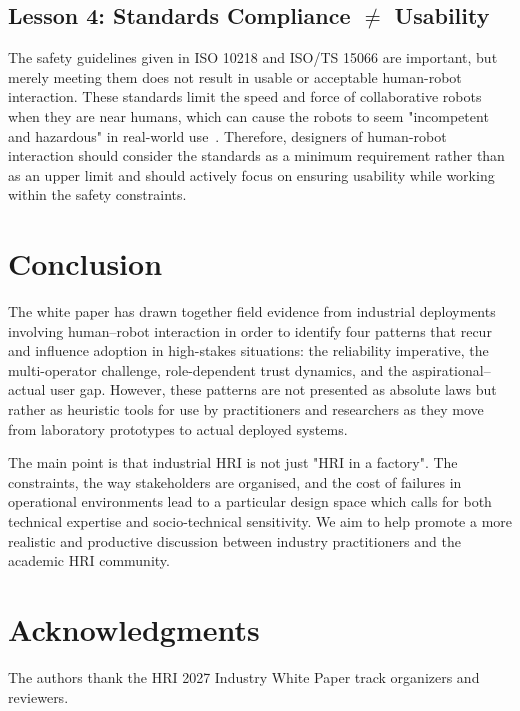 \documentclass[sigconf, nonacm] {acmart}
\begin{document}
\subsection{Lesson 4: Standards Compliance $\neq$ Usability}
The safety guidelines given in ISO 10218 and ISO/TS 15066 are important, but merely meeting them does not result in usable or acceptable human-robot interaction. These standards limit the speed and force of collaborative robots when they are near humans, which can cause the robots to seem "incompetent and hazardous" in real-world use~\cite{robotics2025}. Therefore, designers of human-robot interaction should consider the standards as a minimum requirement rather than as an upper limit and should actively focus on ensuring usability while working within the safety constraints.


\section{Conclusion}
The white paper has drawn together field evidence from industrial deployments involving human–robot interaction in order to identify four patterns that recur and influence adoption in high-stakes situations: the reliability imperative, the multi-operator challenge, role-dependent trust dynamics, and the aspirational–actual user gap. However, these patterns are not presented as absolute laws but rather as heuristic tools for use by practitioners and researchers as they move from laboratory prototypes to actual deployed systems.

The main point is that industrial HRI is not just "HRI in a factory". The constraints, the way stakeholders are organised, and the cost of failures in operational environments lead to a particular design space which calls for both technical expertise and socio-technical sensitivity. We aim to help promote a more realistic and productive discussion between industry practitioners and the academic HRI community.



\section*{Acknowledgments}
The authors thank the HRI 2027 Industry White Paper track organizers and reviewers.




\end{document}
